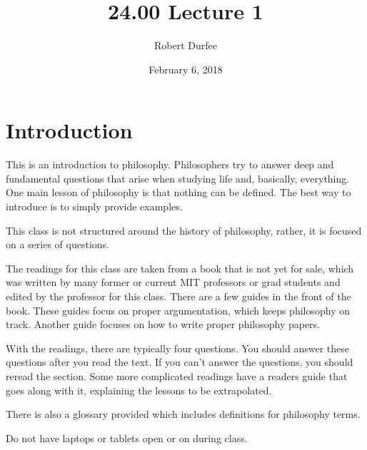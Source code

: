 \documentclass{article}
\title{ 24.00 Lecture 1 }
\author{ Robert Durfee }
\date{ February 6, 2018 }
\begin{document}
\maketitle

\section{ Introduction }

This is an introduction to philosophy. Philosophers try to answer deep and
fundamental questions that arise when studying life and, basically, everything.
One main lesson of philosophy is that nothing can be defined. The best way to
introduce is to simply provide examples.

This class is not structured around the history of philosophy, rather, it is
focused on a series of questions.

The readings for this class are taken from a book that is not yet for sale,
which was written by many former or current MIT professors or grad students and
edited by the professor for this class. There are a few guides in the front of
the book. These guides focus on proper argumentation, which keeps philosophy on
track. Another guide focuses on how to write proper philosophy papers.

With the readings, there are typically four questions. You should answer these
questions after you read the text. If you can't answer the questions, you should
reread the section. Some more complicated readings have a readers guide that
goes along with it, explaining the lessons to be extrapolated.

There is also a glossary provided which includes definitions for philosophy
terms.

Do not have laptops or tablets open or on during class.
\end{document}

